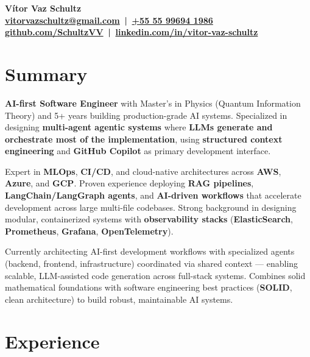 \documentclass[]{deedy-resume-reversed}
\renewcommand{\namesection}[2]{%
  \begin{center}
    \Large \bfseries #1 %
    \vspace{1pt}\\
    \small #2 %
  \end{center}
  \vspace{-10pt} %
}
\providecommand{\sectionsep}{\vspace{6pt}} %
\begin{document}
\namesection{Vítor Vaz Schultz}{
\href{mailto:vitorvazschultz@gmail.com}{vitorvazschultz@gmail.com} \,|\, 
\href{tel:+5555996941986}{+55 55 99694 1986} \\
\href{https://github.com/SchultzVV}{github.com/SchultzVV} \,|\, 
\href{https://linkedin.com/in/vitor-vaz-schultz}{linkedin.com/in/vitor-vaz-schultz}
}

\vspace{0pt}
\begin{minipage}[t]{0.62\textwidth}
\section{Summary}
\textbf{AI-first Software Engineer} with Master's in Physics (Quantum Information Theory) and 5+ years building production-grade AI systems. Specialized in designing \textbf{multi-agent agentic systems} where \textbf{LLMs generate and orchestrate most of the implementation}, using \textbf{structured context engineering} and \textbf{GitHub Copilot} as primary development interface.

Expert in \textbf{MLOps}, \textbf{CI/CD}, and cloud-native architectures across \textbf{AWS}, \textbf{Azure}, and \textbf{GCP}. Proven experience deploying \textbf{RAG pipelines}, \textbf{LangChain/LangGraph agents}, and \textbf{AI-driven workflows} that accelerate development across large multi-file codebases. Strong background in designing modular, containerized systems with \textbf{observability stacks} (\textbf{ElasticSearch}, \textbf{Prometheus}, \textbf{Grafana}, \textbf{OpenTelemetry}).

Currently architecting AI-first development workflows with specialized agents (backend, frontend, infrastructure) coordinated via shared context — enabling scalable, LLM-assisted code generation across full-stack systems. Combines solid mathematical foundations with software engineering best practices (\textbf{SOLID}, clean architecture) to build robust, maintainable AI systems. \sectionsep

\section{Experience}


\end{minipage}
\end{document}
